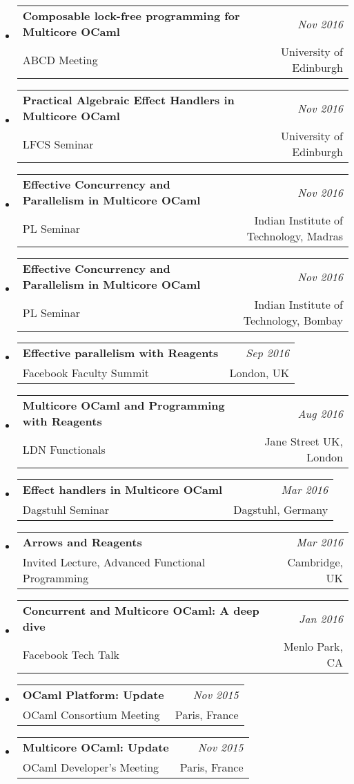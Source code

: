 \documentclass[10pt]{article}
\makeatletter
\newcommand{\lbar}[1]{{\color{#1}\ding{118}}\hspace*{2pt}}
\newenvironment{talk}[4]
{ \item
  \begin{tabular*}{7.5in}{l@{\extracolsep{\fill}}r}
    \textbf{#1} & \textit{#2} \\
		\hspace{1ex} #3 & \small{#4}
\end{tabular*}
} {}
\newenvironment{itemregion}[1]{
	\vspace*{0.5ex}
	{\scalebox{1.4}{\textbf{#1}}}
	\begin{itemize}\itemsep1pt}
	{\end{itemize}\vspace{0.8ex}}
\makeatother
\begin{document}
\begin{itemregion}{\lbar{blue}Talks}

	\begin{talk} {Composable lock-free programming for Multicore OCaml}
		{Nov 2016} {ABCD Meeting} {University of Edinburgh}
	\end{talk}

	\begin{talk} {Practical Algebraic Effect Handlers in Multicore OCaml}
		{Nov 2016} {LFCS Seminar} {University of Edinburgh}
	\end{talk}

 	\begin{talk} {Effective Concurrency and Parallelism in Multicore OCaml}
		{Nov 2016} {PL Seminar} {Indian Institute of Technology, Madras}
	\end{talk}

 	\begin{talk} {Effective Concurrency and Parallelism in Multicore OCaml}
		{Nov 2016} {PL Seminar} {Indian Institute of Technology, Bombay}
	\end{talk}

	\begin{talk} {Effective parallelism with Reagents}
		{Sep 2016} {Facebook Faculty Summit} {London, UK}
	\end{talk}
 	\begin{talk} {Multicore OCaml and Programming with Reagents}
		{Aug 2016} {LDN Functionals} {Jane Street UK, London}
	\end{talk}

	\begin{talk} {Effect handlers in Multicore OCaml}
		{Mar 2016} {Dagstuhl Seminar} {Dagstuhl, Germany}
	\end{talk}

	\begin{talk} {Arrows and Reagents}
		{Mar 2016} {Invited Lecture, Advanced Functional Programming} {Cambridge, UK}
	\end{talk}

	\begin{talk} {Concurrent and Multicore OCaml: A deep dive}
		{Jan 2016} {Facebook Tech Talk} {Menlo Park, CA}
	\end{talk}

	\begin{talk} {OCaml Platform: Update}
		{Nov 2015}{OCaml Consortium Meeting}{Paris, France}
	\end{talk}

	\begin{talk} {Multicore OCaml: Update}
		{Nov 2015}{OCaml Developer's Meeting}{Paris, France}
	\end{talk}


\end{itemregion}
\end{document}
